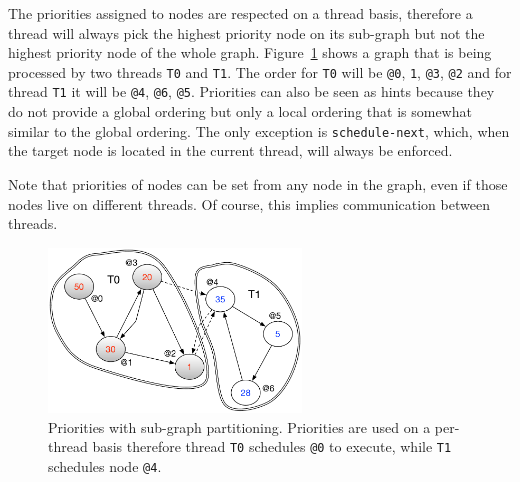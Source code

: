 The priorities assigned to nodes are respected on a thread basis, therefore a
thread will always pick the highest priority node on its sub-graph but not the
highest priority node of the whole graph.
Figure~\ref{fig:coordination:priorities} shows a graph that is being processed
by two threads \texttt{T0} and \texttt{T1}. The order for \texttt{T0} will be
\texttt{@0}, \texttt{1}, \texttt{@3}, \texttt{@2} and for thread \texttt{T1} it
will be \texttt{@4}, \texttt{@6}, \texttt{@5}.  Priorities can also be seen as
hints because they do not provide a global ordering but only a local ordering
that is somewhat similar to the global ordering. The only exception is
\texttt{schedule-next}, which, when the target node is located in the current
thread, will always be enforced.

Note that priorities of nodes can be set from any node in the graph, even if those nodes
live on different threads. Of course, this implies communication between
threads.

\begin{figure}
\begin{center}
   \includegraphics[width=0.6\textwidth]{figures/coordination/priorities.pdf}
\end{center}
\caption{Priorities with sub-graph partitioning. Priorities are used on a
   per-thread basis therefore thread \texttt{T0} schedules \texttt{@0} to
   execute, while \texttt{T1} schedules node \texttt{@4}.}
\label{fig:coordination:priorities}
\end{figure}
